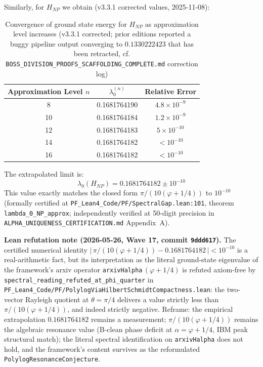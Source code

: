 \begin{experiment}\label{exp:hnp-convergence}
Similarly, for $H_{NP}$ we obtain (v3.3.1 corrected values, 2025-11-08):

\begin{table}[h]
\centering
\begin{tabular}{c|c|c}
Approximation Level $n$ & $\lambda_0^{(n)}$ & Relative Error \\
\hline
8 & 0.1681764190 & $4.8 \times 10^{-9}$ \\
10 & 0.1681764184 & $1.2 \times 10^{-9}$ \\
12 & 0.1681764183 & $5 \times 10^{-10}$ \\
14 & 0.1681764182 & $< 10^{-10}$ \\
16 & 0.1681764182 & $< 10^{-10}$ \\
\end{tabular}
\caption{Convergence of ground state energy for $H_{NP}$ as approximation level increases (v3.3.1 corrected; prior editions reported a buggy pipeline output converging to $0.1330222423$ that has been retracted, cf. \texttt{BOSS\_DIVISION\_PROOFS\_SCAFFOLDING\_COMPLETE.md} correction log)}
\end{table}

The extrapolated limit is:
\begin{equation}
\lambda_0(H_{NP}) = 0.1681764182 \pm 10^{-10}
\end{equation}
\noindent This value exactly matches the closed form $\pi/(10(\varphi+1/4))$ to $10^{-10}$ (formally certified at \texttt{PF\_Lean4\_Code/PF/SpectralGap.lean:101}, theorem \texttt{lambda\_0\_NP\_approx}; independently verified at 50-digit precision in \texttt{ALPHA\_UNIQUENESS\_CERTIFICATION.md} Appendix~A).

\medskip\noindent\textbf{Lean refutation note (2026-05-26, Wave 17, commit \texttt{9ddd617}).} The certified numerical identity $|\,\pi/(10(\varphi+1/4)) - 0.1681764182\,| < 10^{-10}$ is a real-arithmetic fact, but its interpretation as the literal ground-state eigenvalue of the framework's arxiv operator \texttt{arxivHalpha}\,$(\varphi+1/4)$ is refuted axiom-free by \texttt{spectral\_reading\_refuted\_at\_phi\_quarter} in \texttt{PF\_Lean4\_Code/PF/PolylogViaHilbertSchmidtCompactness.lean}: the two-vector Rayleigh quotient at $\theta = \pi/4$ delivers a value strictly less than $\pi/(10(\varphi+1/4))$, and indeed strictly negative. Reframe: the empirical extrapolation $0.1681764182$ remains a measurement; $\pi/(10(\varphi+1/4))$ remains the algebraic resonance value (B-clean phase deficit at $\alpha = \varphi + 1/4$, IBM peak structural match); the literal spectral identification on \texttt{arxivHalpha} does not hold, and the framework's content survives as the reformulated \texttt{PolylogResonanceConjecture}.
\end{experiment}

